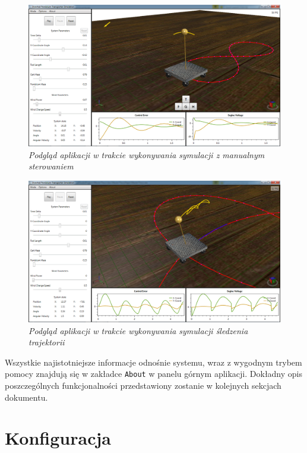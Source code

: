 \documentclass[12pt, oneside]{report}
\theoremstyle{definition}
\begin{document}
\begin{figure}[H]
	\centering
		\includegraphics[width = 400pt]{Application} 
		\caption{\textit{Podgląd aplikacji w trakcie wykonywania symulacji z manualnym sterowaniem}}
		\label{Application}
\end{figure}

\begin{figure}[H]
	\centering
		\includegraphics[width = 400pt]{Simulation} 
		\caption{\textit{Podgląd aplikacji w trakcie wykonywania symulacji śledzenia trajektorii}}
		\label{Simulation}
\end{figure}

Wszystkie najistotniejsze informacje odnośnie systemu, wraz z wygodnym trybem pomocy znajdują się w zakładce \texttt{About} w panelu górnym aplikacji. Dokładny opis poszczególnych funkcjonalności przedstawiony zostanie w kolejnych sekcjach dokumentu.

\section{Konfiguracja}
\end{document}
